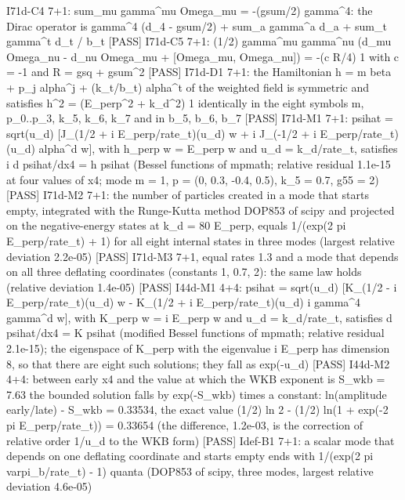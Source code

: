 \documentclass[
  10pt,
]{article}
\newenvironment{Shaded}{}{}
\newcommand{\NormalTok}[1]{#1}
\begin{document}
\begin{Shaded}
\begin{Highlighting}[]
\NormalTok{[PASS] I71d{-}C4  7+1: sum\_mu gamma\^{}mu Omega\_mu = {-}(gsum/2) gamma\^{}4: the Dirac operator is gamma\^{}4 (d\_4 {-} gsum/2) + sum\_a gamma\^{}a d\_a + sum\_t gamma\^{}t d\_t / b\_t}
\NormalTok{[PASS] I71d{-}C5  7+1: (1/2) gamma\^{}mu gamma\^{}nu (d\_mu Omega\_nu {-} d\_nu Omega\_mu + [Omega\_mu, Omega\_nu]) = {-}(c R/4) 1 with c = {-}1 and R = gsq + gsum\^{}2}
\NormalTok{[PASS] I71d{-}D1  7+1: the Hamiltonian h = m beta + p\_j alpha\^{}j + (k\_t/b\_t) alpha\^{}t of the weighted field is symmetric and satisfies h\^{}2 = (E\_perp\^{}2 + k\_d\^{}2) 1 identically in the eight symbols m, p\_0..p\_3, k\_5, k\_6, k\_7 and in b\_5, b\_6, b\_7}
\NormalTok{[PASS] I71d{-}M1  7+1: psihat = sqrt(u\_d) [J\_(1/2 + i E\_perp/rate\_t)(u\_d) w + i J\_({-}1/2 + i E\_perp/rate\_t)(u\_d) alpha\^{}d w], with h\_perp w = E\_perp w and u\_d = k\_d/rate\_t, satisfies i d psihat/dx4 = h psihat (Bessel functions of mpmath; relative residual 1.1e{-}15 at four values of x4; mode m = 1, p = (0, 0.3, {-}0.4, 0.5), k\_5 = 0.7, g55 = 2)}
\NormalTok{[PASS] I71d{-}M2  7+1: the number of particles created in a mode that starts empty, integrated with the Runge{-}Kutta method DOP853 of scipy and projected on the negative{-}energy states at k\_d = 80 E\_perp, equals 1/(exp(2 pi E\_perp/rate\_t) + 1) for all eight internal states in three modes (largest relative deviation 2.2e{-}05)}
\NormalTok{[PASS] I71d{-}M3  7+1, equal rates 1.3 and a mode that depends on all three deflating coordinates (constants 1, 0.7, 2): the same law holds (relative deviation 1.4e{-}05)}
\NormalTok{[PASS] I44d{-}M1  4+4: psihat = sqrt(u\_d) [K\_(1/2 {-} i E\_perp/rate\_t)(u\_d) w {-} K\_(1/2 + i E\_perp/rate\_t)(u\_d) i gamma\^{}4 gamma\^{}d w], with K\_perp w = i E\_perp w and u\_d = k\_d/rate\_t, satisfies d psihat/dx4 = K psihat (modified Bessel functions of mpmath; relative residual 2.1e{-}15); the eigenspace of K\_perp with the eigenvalue i E\_perp has dimension 8, so that there are eight such solutions; they fall as exp({-}u\_d)}
\NormalTok{[PASS] I44d{-}M2  4+4: between early x4 and the value at which the WKB exponent is S\_wkb = 7.63 the bounded solution falls by exp({-}S\_wkb) times a constant: ln(amplitude early/late) {-} S\_wkb = 0.33534, the exact value (1/2) ln 2 {-} (1/2) ln(1 + exp({-}2 pi E\_perp/rate\_t)) = 0.33654 (the difference, 1.2e{-}03, is the correction of relative order 1/u\_d to the WKB form)}
\NormalTok{[PASS] Idef{-}B1  7+1: a scalar mode that depends on one deflating coordinate and starts empty ends with 1/(exp(2 pi varpi\_b/rate\_t) {-} 1) quanta (DOP853 of scipy, three modes, largest relative deviation 4.6e{-}05)}

\end{Highlighting}
\end{Shaded}
\end{document}
